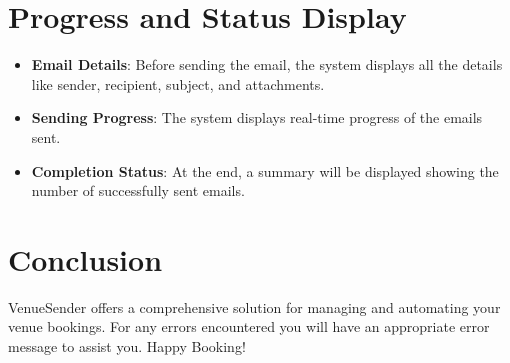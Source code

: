 \documentclass{article}
\begin{document}
	\section{Progress and Status Display}
	
	\begin{itemize}
		\item \textbf{Email Details}: Before sending the email, the system displays all the details like sender, recipient, subject, and attachments.
		\item \textbf{Sending Progress}: The system displays real-time progress of the emails sent.
		\item \textbf{Completion Status}: At the end, a summary will be displayed showing the number of successfully sent emails.
	\end{itemize}

	\section{Conclusion}

	VenueSender offers a comprehensive solution for managing and automating your venue bookings. For any errors encountered you will have an appropriate error message to assist you.
	\newline
	\newline
	Happy Booking!
	
\end{document}
